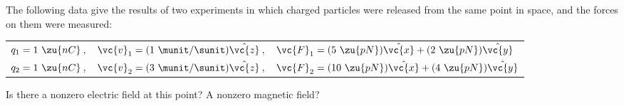         The following data give the results of two experiments in which charged particles
        were released from the same point in space, and the forces on them were measured:
        
        \begin{tabular}{lll}
                $q_1=1\ \zu{nC}\:,$ & $\vc{v}_1=(1\ \munit/\sunit)\hat{\vc{z}}\:,$ & $\vc{F}_1=(5\ \zu{pN})\hat{\vc{x}}+(2\ \zu{pN})\hat{\vc{y}}$\\
                $q_2=1\ \zu{nC}\:,$ & $\vc{v}_2=(3\ \munit/\sunit)\hat{\vc{z}}\:,$ & $\vc{F}_2=(10\ \zu{pN})\hat{\vc{x}}+(4\ \zu{pN})\hat{\vc{y}}$\\
        \end{tabular}

        \noindent Is there a nonzero electric field at this point? A nonzero magnetic field?
